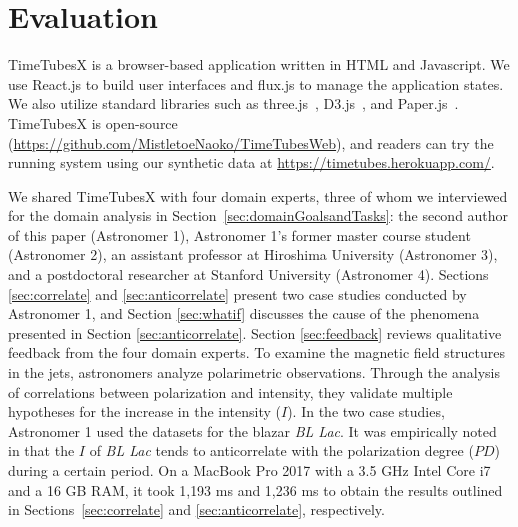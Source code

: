 \section{Evaluation\label{sec:evaluation}}
TimeTubesX is a browser-based application written in HTML and Javascript.
We use React.js to build user interfaces and flux.js to manage the application states.
We also utilize standard libraries such as three.js~\cite{three_framework}, D3.js~\cite{d3_framework}, and Paper.js~\cite{paper_framework}.
TimeTubesX is open-source (\url{https://github.com/MistletoeNaoko/TimeTubesWeb}), and 
readers can try the running system using our synthetic data at \url{https://timetubes.herokuapp.com/}.

We shared TimeTubesX with four domain experts, three of whom we interviewed for the domain analysis in Section~\ref{sec:domainGoalsandTasks}: the second author of this paper (Astronomer 1), Astronomer 1’s former master course student (Astronomer 2), an assistant professor at Hiroshima University (Astronomer 3), and a postdoctoral researcher at Stanford University (Astronomer 4). Sections \ref{sec:correlate} and \ref{sec:anticorrelate} present two case studies conducted by Astronomer 1, and Section \ref{sec:whatif} discusses the cause of the phenomena presented in Section \ref{sec:anticorrelate}. Section \ref{sec:feedback} reviews qualitative feedback from the four domain experts.
To examine the magnetic field structures in the jets, 
astronomers analyze polarimetric observations. 
Through the analysis of correlations between polarization and intensity, 
they validate multiple hypotheses for the increase in the intensity ($I$). 
In the two case studies, Astronomer 1 used the datasets for the blazar \emph{BL Lac}.
It was empirically noted in \cite{Gaur2014} that the $I$ of \emph{BL Lac} tends to anticorrelate with the polarization degree ($PD$) during a certain period.
On a MacBook Pro 2017 with a 3.5 GHz Intel Core i7 and a 16 GB RAM, it took 1{,}193 ms and 1{,}236 ms to obtain the results outlined in Sections~\ref{sec:correlate} and \ref{sec:anticorrelate}, respectively.
%

